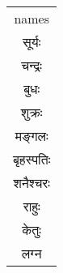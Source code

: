 \begin{table}
\begin{tabular}{c}
names\\
सूर्यः \\
चन्द्रः \\
बुधः \\
शुक्रः \\
मङ्गलः \\
बृहस्पतिः \\
शनैश्चरः \\
राहुः \\
केतुः \\
लग्न 
\end{tabular} 
\end{table}
